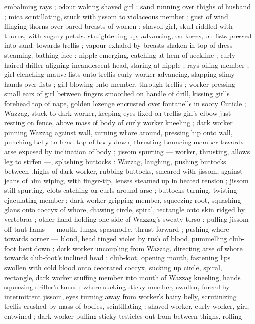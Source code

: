 embalming rays ; odour waking shaved girl : sand running over 
thighs of husband ; mica scintillating, stuck with jissom to violaceous 
member ; gust of wind flinging thorns over bared breasts of women 
; shaved girl, skull riddled with thorns, with sugary petals. 
straightening up, advancing, on knees, on fists pressed into sand. 
towards trellis ; vapour exhaled by breasts shaken in top of dress 
steaming, bathing face : nipple emerging, catching at hem of 
neckline ; curly-haired driller aligning incandescent head, staring at 
nipple ; rays oiling member ; girl clenching mauve fists onto trellis 
curly worker advancing, slapping slimy hands over fists ; girl blowing 
onto member, through trellis ; worker pressing small ears of girl 
between fingers smoothed on handle of drill, kissing girl's forehead 
top of nape, golden lozenge encrusted over fontanelle in sooty 
Cuticle ; Wazzag, stuck to dark worker, keeping eyes fixed on trellis 
girl's elbow just resting on fence, above mass of body of curly 
worker kneeling ; dark worker pinning Wazzag against wall, turning 
whore around, pressing hip onto wall, punching belly to bend top of 
body down, thrusting bouncing member towards arse exposed by 
inclination of body ; jissom spurting --- worker, thrusting, allows leg 
to stiffen ---, splashing buttocks : Wazzag, laughing, pushing 
buttocks between thighs of dark worker, rubbing buttocks, smeared 
with jissom, against jeans of him wiping, with finger-tip, lenses 
steamed up in heated tension ; jissom still spurting, clots catching on 
curls around arse ; buttocks turning, twisting ejaculating member ; 
dark worker gripping member, squeezing root, squashing glans onto 
coccyx of whore, drawing circle, spiral, rectangle onto skin ridged by 
vertebrae ; other hand holding one side of Wazzag's sweaty torso : 
pulling jissom off taut hams --- mouth, lungs, spasmodic, thrust 
forward ; pushing whore towards corner --- blond, head tinged violet 
by rush of blood, pummelling club-foot bent down ; dark worker 
uncoupling from Wazzag, directing arse of whore towards club-foot's 
inclined head ; club-foot, opening mouth, fastening lips swollen with 
cold blood onto decorated coccyx, sucking up circle, spiral, 
rectangle, dark worker stuffing member into mouth of Wazzag 
kneeling, hands squeezing driller's knees ; whore sucking sticky 
member, swollen, forced by intermittent jissom, eyes turning away 
from worker's hairy belly, scrutinizing trellis crushed by mass of 
bodies, scintillating : shaved worker, curly worker, girl, entwined ; 
dark worker pulling sticky testicles out from between thighs, rolling 
